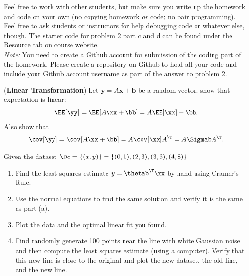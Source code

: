 \documentclass[12pt,letterpaper]{hmcpset}
\begin{document}
Feel free to work with other students, but make sure you write up the homework
and code on your own (no copying homework \textit{or} code; no pair programming).
Feel free to ask students or instructors for help debugging code or whatever else,
though.
The starter code for problem 2 part c and d can be found under the Resource tab on course website.\\

\textit{Note:} You need to create a Github account for submission of the coding part of the homework. Please create a repository on Github to hold all your code and include your Github account username as part of the answer to problem 2.

\begin{problem}[1]
	(\textbf{Linear Transformation}) Let $\mathbf{y} = A\mathbf{x} + \mathbf{b}$ be a random vector.
	show that expectation is linear:
	\[
		\EE[\yy] = \EE[A\xx + \bb] = A\EE[\xx] + \bb.
	\]
	Also show that
	\[
		\cov[\yy] = \cov[A\xx + \bb] = A \cov[\xx] A^\T = A\Sigmab A^\T.
	\]
\end{problem}
\begin{solution}
	\vfill
\end{solution}
\newpage




\begin{problem}[2]
	Given the dataset $\Dc = \{(x,y)\} = \{(0,1), (2,3), (3,6), (4,8)\}$
	\begin{enumerate}
		\item Find the least squares estimate $y = \thetab^\T\xx$ by hand using
		      Cramer's Rule.
		\item Use the normal equations to find the same solution and verify it
		      is the same as part (a).
		\item Plot the data and the optimal linear fit you found.
		\item Find randomly generate 100 points near the line with white Gaussian
		      noise and then compute the least squares estimate (using a computer).
		      Verify that this new line is close to the original and plot the new
		      dataset, the old line, and the new line.
	\end{enumerate}

\end{problem}
\begin{solution}
	\vfill
\end{solution}
\newpage
\end{document}
